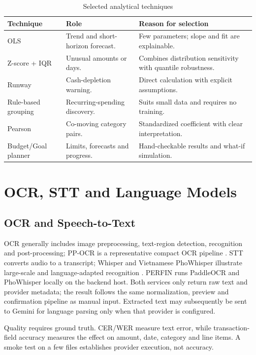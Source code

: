 \begin{table}[H]
  \centering
  \caption{Selected analytical techniques}
  \label{tab:algorithm-selection}
  \begin{tabularx}{\textwidth}{@{}L{3.0cm}Y Y@{}}
    \toprule
    \textbf{Technique} & \textbf{Role} & \textbf{Reason for selection} \\
    \midrule
    OLS & Trend and short-horizon forecast. & Few parameters; slope and fit are explainable. \\
    Z-score + IQR & Unusual amounts or days. & Combines distribution sensitivity with quantile robustness. \\
    Runway & Cash-depletion warning. & Direct calculation with explicit assumptions. \\
    Rule-based grouping & Recurring-spending discovery. & Suits small data and requires no training. \\
    Pearson & Co-moving category pairs. & Standardized coefficient with clear interpretation. \\
    Budget/Goal planner & Limits, forecasts and progress. & Hand-checkable results and what-if simulation. \\
    \bottomrule
  \end{tabularx}
\end{table}

\section{OCR, STT and Language Models}

\subsection{OCR and Speech-to-Text}
\label{subsec:ocr-stt}

OCR generally includes image preprocessing, text-region detection, recognition and post-processing; PP-OCR is a representative compact OCR pipeline \cite{ppocr2020}. STT converts audio to a transcript; Whisper and Vietnamese PhoWhisper illustrate large-scale and language-adapted recognition \cite{radford2022,phowhisper2024}. PERFIN runs PaddleOCR and PhoWhisper locally on the backend host. Both services only return raw text and provider metadata; the result follows the same normalization, preview and confirmation pipeline as manual input. Extracted text may subsequently be sent to Gemini for language parsing only when that provider is configured.

Quality requires ground truth. CER/WER measure text error, while transaction-field accuracy measures the effect on amount, date, category and line items. A smoke test on a few files establishes provider execution, not accuracy.

